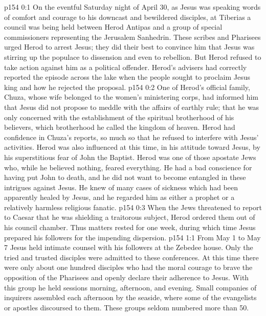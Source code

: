 \author{Midwayer Commission}
\vs p154 0:1 On the eventful Saturday night of April 30, as Jesus was speaking words of comfort and courage to his downcast and bewildered disciples, at Tiberias a council was being held between Herod Antipas and a group of special commissioners representing the Jerusalem Sanhedrin. These scribes and Pharisees urged Herod to arrest Jesus; they did their best to convince him that Jesus was stirring up the populace to dissension and even to rebellion. But Herod refused to take action against him as a political offender. Herod’s advisers had correctly reported the episode across the lake when the people sought to proclaim Jesus king and how he rejected the proposal.
\vs p154 0:2 One of Herod’s official family, Chuza, whose wife belonged to the women’s ministering corps, had informed him that Jesus did not propose to meddle with the affairs of earthly rule; that he was only concerned with the establishment of the spiritual brotherhood of his believers, which brotherhood he called the kingdom of heaven. Herod had confidence in Chuza’s reports, so much so that he refused to interfere with Jesus’ activities. Herod was also influenced at this time, in his attitude toward Jesus, by his superstitious fear of John the Baptist. Herod was one of those apostate Jews who, while he believed nothing, feared everything. He had a bad conscience for having put John to death, and he did not want to become entangled in these intrigues against Jesus. He knew of many cases of sickness which had been apparently healed by Jesus, and he regarded him as either a prophet or a relatively harmless religious fanatic.
\vs p154 0:3 When the Jews threatened to report to Caesar that he was shielding a traitorous subject, Herod ordered them out of his council chamber. Thus matters rested for one week, during which time Jesus prepared his followers for the impending dispersion.
\vs p154 1:1 From May 1 to May 7 Jesus held intimate counsel with his followers at the Zebedee house. Only the tried and trusted disciples were admitted to these conferences. At this time there were only about one hundred disciples who had the moral courage to brave the opposition of the Pharisees and openly declare their adherence to Jesus. With this group he held sessions morning, afternoon, and evening. Small companies of inquirers assembled each afternoon by the seaside, where some of the evangelists or apostles discoursed to them. These groups seldom numbered more than 50.
